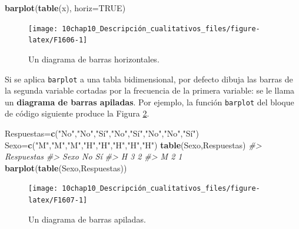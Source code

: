 \documentclass[
]{book}
\newenvironment{Shaded}{\begin{snugshade}}{\end{snugshade}}
\newcommand{\CommentTok}[1]{\textcolor[rgb]{0.56,0.35,0.01}{\textit{#1}}}
\newcommand{\DataTypeTok}[1]{\textcolor[rgb]{0.13,0.29,0.53}{#1}}
\newcommand{\KeywordTok}[1]{\textcolor[rgb]{0.13,0.29,0.53}{\textbf{#1}}}
\newcommand{\NormalTok}[1]{#1}
\newcommand{\OtherTok}[1]{\textcolor[rgb]{0.56,0.35,0.01}{#1}}
\newcommand{\StringTok}[1]{\textcolor[rgb]{0.31,0.60,0.02}{#1}}
\theoremstyle{definition}
\theoremstyle{definition}
\theoremstyle{definition}
\theoremstyle{remark}
\begin{document}
\begin{Shaded}
\begin{Highlighting}[]
\KeywordTok{barplot}\NormalTok{(}\KeywordTok{table}\NormalTok{(x), }\DataTypeTok{horiz=}\OtherTok{TRUE}\NormalTok{)}
\end{Highlighting}
\end{Shaded}

\begin{figure}

{\centering \texttt{[image: 10chap10\_Descripción\_cualitativos\_files/figure-latex/F1606-1]} 

}

\caption{Un diagrama de barras horizontales.}\label{fig:F1606}
\end{figure}

Si se aplica \texttt{barplot} a una tabla bidimensional, por defecto dibuja las barras de la segunda variable cortadas por la frecuencia de la primera variable: se le llama un \textbf{diagrama de barras apiladas}. Por ejemplo, la función \texttt{barplot} del bloque de código siguiente produce la Figura \ref{fig:F1607}.

\begin{Shaded}
\begin{Highlighting}[]
\NormalTok{Respuestas=}\KeywordTok{c}\NormalTok{(}\StringTok{"No"}\NormalTok{,}\StringTok{"No"}\NormalTok{,}\StringTok{"Sí"}\NormalTok{,}\StringTok{"No"}\NormalTok{,}\StringTok{"Sí"}\NormalTok{,}\StringTok{"No"}\NormalTok{,}\StringTok{"No"}\NormalTok{,}\StringTok{"Sí"}\NormalTok{)}
\NormalTok{Sexo=}\KeywordTok{c}\NormalTok{(}\StringTok{"M"}\NormalTok{,}\StringTok{"M"}\NormalTok{,}\StringTok{"M"}\NormalTok{,}\StringTok{"H"}\NormalTok{,}\StringTok{"H"}\NormalTok{,}\StringTok{"H"}\NormalTok{,}\StringTok{"H"}\NormalTok{,}\StringTok{"H"}\NormalTok{)}
\KeywordTok{table}\NormalTok{(Sexo,Respuestas)}
\CommentTok{\#\textgreater{}     Respuestas}
\CommentTok{\#\textgreater{} Sexo No Sí}
\CommentTok{\#\textgreater{}    H  3  2}
\CommentTok{\#\textgreater{}    M  2  1}
\KeywordTok{barplot}\NormalTok{(}\KeywordTok{table}\NormalTok{(Sexo,Respuestas))}
\end{Highlighting}
\end{Shaded}

\begin{figure}

{\centering \texttt{[image: 10chap10\_Descripción\_cualitativos\_files/figure-latex/F1607-1]} 

}

\caption{Un diagrama de barras apiladas.}\label{fig:F1607}
\end{figure}
\end{document}
